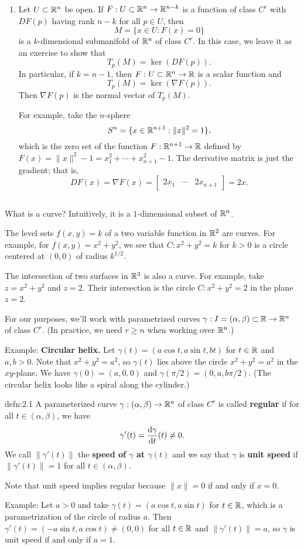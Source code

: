 \begin{enumerate}[(1)]
    \item Let $U \subset \mathbb{R}^n$ be open. If $F : U \subset \mathbb{R}^n \to \mathbb{R}^{n-k}$ is a function of 
    class $C^r$ with $DF(p)$ having rank $n-k$ for all $p \in U$, then 
    \[ M = \{x \in U : F(x) = 0\} \] 
    is a $k$-dimensional submanifold of $\mathbb{R}^n$ of class $C^r$. In this case, we leave it as an 
    exercise to show that 
    \[ T_p(M) = \ker(DF(p)). \] 
    In particular, if $k = n-1$, then $F : U \subset \mathbb{R}^n \to \mathbb{R}$ is a scalar function and 
    \[ T_p(M) = \ker(\nabla F(p)). \] 
    Then $\nabla F(p)$ is the normal vector of $T_p(M)$. 

    For example, take the $n$-sphere 
    \[ S^n = \{x \in \mathbb{R}^{n+1} : \|x\|^2 = 1\}, \] 
    which is the zero set of the function $F : \mathbb{R}^{n+1} \to \mathbb{R}$ defined by $F(x) = \|x\|^2 - 1 
    = x_1^2 + \cdots + x_{n+1}^2 - 1$. The derivative matrix is just the gradient; that is, 
    \[ DF(x) = \nabla F(x) = \begin{bmatrix} 2x_1 & \cdots & 2x_{n+1} \end{bmatrix} = 2x. \] 
\end{enumerate}

\subsection{}\label{subsec:2.1}
What is a curve? Intuitively, it is a $1$-dimensional subset of $\mathbb{R}^n$. 

The level sets $f(x, y) = k$ of a two variable function in $\mathbb{R}^2$ are curves. 
For example, for $f(x, y) = x^2 + y^2$, we see that $C \colon x^2 + y^2 = k$ for $k > 0$ 
is a circle centered at $(0, 0)$ of radius $k^{1/2}$. 

The intersection of two surfaces in $\mathbb{R}^3$ is also a curve. For example, 
take $z = x^2 + y^2$ and $z = 2$. Their intersection is the circle 
$C \colon x^2 + y^2 = 2$ in the plane $z = 2$.

For our purposes, we'll work with parametrized curves $\gamma : I = (\alpha, \beta) \subset 
\mathbb{R} \to \mathbb{R}^n$ of class $C^r$. (In practice, we need $r \geq n$ when working over $\mathbb{R}^n$.)

Example: {\bf Circular helix.} Let $\gamma(t) = (a\cos t, a\sin t, bt)$ for $t \in \mathbb{R}$ and $a, b > 0$. 
Note that $x^2 + y^2 = a^2$, so $\gamma(t)$ lies above the circle $x^2 + y^2 = a^2$ in the $xy$-plane. 
We have $\gamma(0) = (a, 0, 0)$ and $\gamma(\pi/2) = (0, a, b\pi/2)$. (The circular helix 
looks like a spiral along the cylinder.)

\begin{defn}{defn:2.1}
    A parameterized curve $\gamma : (\alpha, \beta) \to \mathbb{R}^n$ of class $C^r$ is called 
    {\bf regular} if for all $t \in (\alpha, \beta)$, we have 
    \[ \gamma'(t) = \frac{{\rm d}\gamma}{{\rm d}t}(t) \neq 0. \] 
    We call $\|\gamma'(t)\|$ the {\bf speed of $\gamma$ 
    at $\gamma(t)$} and we say that $\gamma$ is {\bf unit speed} if $\|\gamma'(t)\| = 1$ for all 
    $t \in (\alpha, \beta)$. 
\end{defn}\vspace{-0.25cm}
Note that unit speed implies regular because $\|x\| = 0$ if and only if $x = 0$. 

Example: Let $a > 0$ and take $\gamma(t) = (a\cos t, a\sin t)$ for $t \in \mathbb{R}$, which is a 
parametrization of the circle of radius $a$. Then $\gamma'(t) = (-a\sin t, a\cos t) \neq (0, 0)$ 
for all $t \in \mathbb{R}$ and $\|\gamma'(t)\| = a$, so $\gamma$ is unit speed if and only if $a = 1$.  